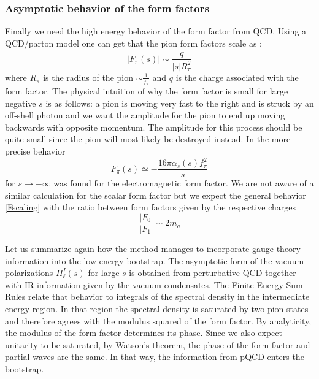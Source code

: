 \documentclass[12pt,letterpaper]{article}
\newcommand{\beq}{\begin{equation}}
\newcommand{\eeq}{\end{equation}}
\newcommand{\half}{\ensuremath{\frac{1}{2}}}
\newcommand{\yifei}[1]{\textbf{\color{red}\footnotesize[Y: #1]}}
\begin{document}
\subsubsection{Asymptotic behavior of the form factors}\label{FFasymsection}

 Finally we need the high energy behavior of the form factor from QCD. Using a QCD/parton model one can get that the pion form factors scale as \cite{Pire:1996bc}:
 \beq
  |F_\pi(s)| \sim \frac{|q|}{|s| R_\pi^2} \label{Fscaling}
 \eeq   
where $R_\pi$ is the radius of the pion $\sim\frac{1}{f_\pi}$ and $q$ is the charge associated with the form factor. The physical intuition of why the form factor is small for large negative $s$ is as follows: a pion is moving very fast to the right and is struck by an off-shell photon and we want the amplitude for the pion to end up moving backwards with opposite momentum. The amplitude for this process should be quite small since the pion will most likely be destroyed instead. In \cite{osti_1447331} the more precise behavior
\beq
 F_\pi(s) \simeq - \frac{16\pi \alpha_s(s) f_\pi^2}{s}  \label{ffQCD}
\eeq    
for $s\rightarrow-\infty$ was found for the electromagnetic form factor.  We are not aware of a similar calculation for the scalar form factor but we expect the general behavior \eqref{Fscaling} with the ratio between form factors given by the respective charges 
\beq\label{ffratioasymp}
 \frac{|F_0|}{|F_1|} \sim 2 m_q
\eeq
%

\bigskip

Let us summarize again how the method manages to incorporate gauge theory information into the low energy bootstrap. The asymptotic form of the vacuum polarizations $\Pi^I_\ell(s)$ for large $s$ is obtained from perturbative QCD together with IR information given by the vacuum condensates. The Finite Energy Sum Rules relate that behavior to integrals of the spectral density in the intermediate energy region. In that region the spectral density is saturated by two pion states and therefore agrees with the modulus squared of the form factor. By analyticity, the modulus of the form factor determines its phase. Since we also expect unitarity to be saturated, by Watson's theorem, the phase of the form-factor and partial waves are the same. In that way, the information from pQCD enters the bootstrap. 
\end{document}

